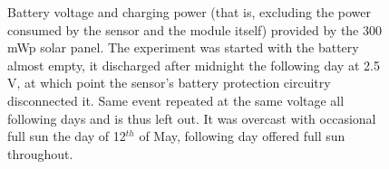 \begin{figure}[p]
    
    \caption{\label{fig:power-log}Battery voltage and charging power (that is, excluding the power consumed by the sensor and the module itself) provided by the 300 mWp solar panel. The experiment was started with the battery almost empty, it discharged after midnight the following day at 2.5 V, at which point the sensor's battery protection circuitry disconnected it. Same event repeated at the same voltage all following days and is thus left out. It was overcast with occasional full sun the day of 12$^{th}$ of May, following day offered full sun throughout.}
\end{figure}


